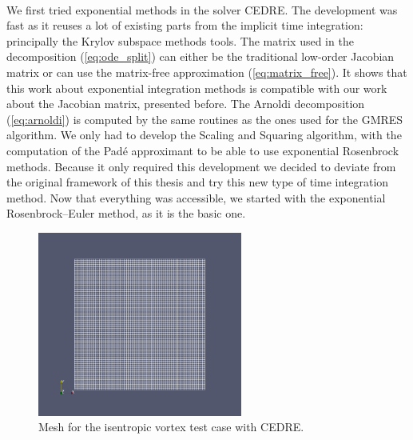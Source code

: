     \paragraph{}
    We first tried exponential methods in the solver CEDRE.
    The development was fast as it reuses a lot of existing parts from the implicit time integration: principally the Krylov subspace methods tools.
    The matrix used in the decomposition (\ref{eq:ode_split}) can either be the traditional low-order Jacobian matrix or can use the matrix-free approximation (\ref{eq:matrix_free}).
    It shows that this work about exponential integration methods is compatible with our work about the Jacobian matrix, presented before.
    The Arnoldi decomposition (\ref{eq:arnoldi}) is computed by the same routines as the ones used for the GMRES algorithm.
    We only had to develop the Scaling and Squaring algorithm, with the computation of the Padé approximant to be able to use exponential Rosenbrock methods.
    Because it only required this development we decided to deviate from the original framework of this thesis and try this new type of time integration method.
    Now that everything was accessible, we started with the exponential Rosenbrock--Euler method, as it is the basic one.

    \begin{figure}
      \centering
      \includegraphics[width=0.6\textwidth]{figures/covo_cedre_mesh.png}
      \caption{Mesh for the isentropic vortex test case with CEDRE.}
      \label{fig:covo_cedre_mesh}
    \end{figure}

